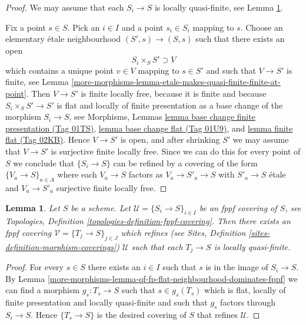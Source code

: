 \documentclass{amsart}
\theoremstyle{plain}
\newtheorem{lemma}[subsection]{Lemma}
\theoremstyle{definition}
\theoremstyle{remark}
\numberwithin{equation}{subsection}
\begin{document}
\begin{proof}
We may assume that each $S_i \to S$ is locally quasi-finite, see
Lemma \ref{more-morphisms-lemma-qf-fp-flat-dominates-fppf}.

\medskip\noindent
Fix a point $s \in S$. Pick an $i \in I$ and a point
$s_i \in S_i$ mapping to $s$. Choose an elementary \'etale neighbourhood
$(S', s) \to (S, s)$ such that there exists an open
$$
S_i \times_S S'  \supset V
$$
which contains a unique point $v \in V$ mapping to $s \in S'$
and such that $V \to S'$ is finite, see
Lemma \ref{more-morphisms-lemma-etale-makes-quasi-finite-finite-at-point}.
Then $V \to S'$ is finite locally free, because it is finite
and because $S_i \times_S S' \to S'$ is flat and locally of finite presentation
as a base change of the morphism $S_i \to S$, see
Morphisms, Lemmas \href{https://stacks.math.columbia.edu/tag/01TS}{lemma base change finite presentation (Tag 01TS)},
\href{https://stacks.math.columbia.edu/tag/01U9}{lemma base change flat (Tag 01U9)}, and
\href{https://stacks.math.columbia.edu/tag/02KB}{lemma finite flat (Tag 02KB)}.
Hence $V \to S'$ is open, and after shrinking $S'$
we may assume that $V \to S'$ is surjective finite locally free.
Since we can do this for every point of $S$ we conclude that
$\{S_i \to S\}$ can be refined by a covering of the form
$\{V_a \to S\}_{a \in A}$ where each $V_a \to S$ factors as
$V_a \to S'_a \to S$ with $S'_a \to S$ \'etale and $V_a \to S'_a$ surjective
finite locally free.
\end{proof}


\begin{lemma}
\label{more-morphisms-lemma-qf-fp-flat-dominates-fppf}
Let $S$ be a scheme. Let $\mathcal{U} = \{S_i \to S\}_{i \in I}$ be an fppf
covering of $S$, see
Topologies, Definition \ref{topologies-definition-fppf-covering}.
Then there exists an fppf covering $\mathcal{V} = \{T_j \to S\}_{j \in J}$
which refines (see
Sites, Definition \ref{sites-definition-morphism-coverings})
$\mathcal{U}$ such that each $T_j \to S$ is locally quasi-finite.
\end{lemma}

\begin{proof}
For every $s \in S$ there exists an $i \in I$ such that $s$ is in
the image of $S_i \to S$. By
Lemma \ref{more-morphisms-lemma-qf-fp-flat-neighbourhood-dominates-fppf}
we can find a morphism $g_s : T_s \to S$ such that $s \in g_s(T_s)$
which is flat, locally of finite presentation and locally quasi-finite
and such that $g_s$ factors through $S_i \to S$. Hence
$\{T_s \to S\}$ is the desired covering of $S$ that refines $\mathcal{U}$.
\end{proof}
\end{document}
